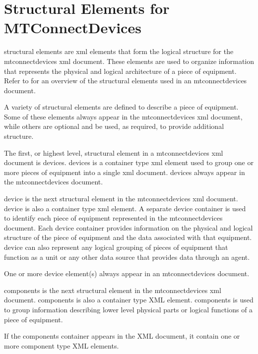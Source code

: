 \section{Structural Elements for MTConnectDevices}
\label{sec:Structural Elements for MTConnectDevices}
\lstset{numbers=left,xleftmargin=2em}

\glspl{structural element} are \gls{xml} elements that form the logical structure for the \gls{mtconnectdevices} \gls{xml} document.  These elements are used to organize information that represents the physical and logical architecture of a piece of equipment.  Refer to  for an overview of the \glspl{structural element} used in an \gls{mtconnectdevices} document.

A variety of \glspl{structural element} are defined to describe a piece of equipment.  Some of these elements \MUST always appear in the \gls{mtconnectdevices} \gls{xml} document, while others are optional and \may be used, as required, to provide additional structure.

The first, or highest level, \gls{structural element} in a \gls{mtconnectdevices} \gls{xml} document is \gls{devices}. \gls{devices} is a container type \gls{xml} element used to group one or more pieces of equipment into a single \gls{xml} document.  \gls{devices} \MUST always appear in the \gls{mtconnectdevices} document.

\gls{device} is the next \gls{structural element} in the \gls{mtconnectdevices} \gls{xml} document. \gls{device} is also a container type \gls{xml} element. A separate \gls{device} container is used to identify each piece of equipment represented in the \gls{mtconnectdevices} document. Each \gls{device} container provides information on the physical and logical structure of the piece of equipment and the data associated with that equipment. \gls{device} can also represent any logical grouping of pieces of equipment that function as a unit or any other data source that provides data through an \gls{agent}.

One or more \gls{device} element(s) \MUST always appear in an \gls{mtconnectdevices} document.

\gls{components} is the next \gls{structural element} in the \gls{mtconnectdevices} \gls{xml} document. \gls{components} is also a container type XML element. \gls{components} is used to group information describing \gls{lower level} physical parts or logical functions of a piece of equipment.

If the \gls{components} container appears in the XML document, it \MUST contain one or more \gls{component} type XML elements.

